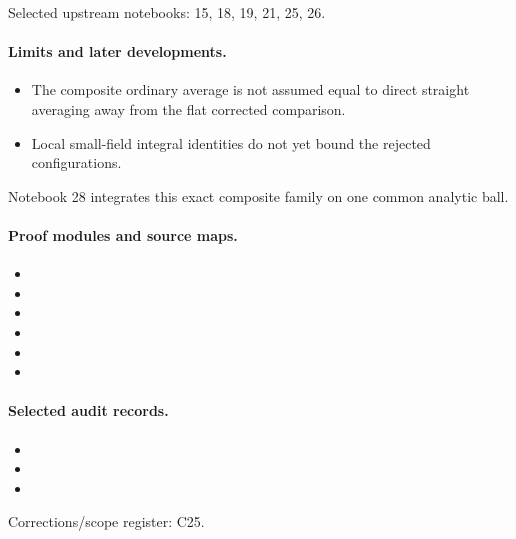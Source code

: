 Selected upstream notebooks: 15, 18, 19, 21, 25, 26.\par

\paragraph{Limits and later developments.}
\begin{itemize}
\item The composite ordinary average is not assumed equal to direct straight averaging away from the flat corrected comparison.
\item Local small-field integral identities do not yet bound the rejected configurations.
\end{itemize}

Notebook 28 integrates this exact composite family on one common analytic ball.

\paragraph{Proof modules and source maps.}
\begingroup\small
\begin{itemize}
\item {}
\item {}
\item {}
\item {}
\item {}
\item {}
\end{itemize}
\endgroup

\paragraph{Selected audit records.}
\begingroup\small
\begin{itemize}
\item {}
\item {}
\item {}
\end{itemize}
\endgroup
Corrections/scope register: C25.\par

